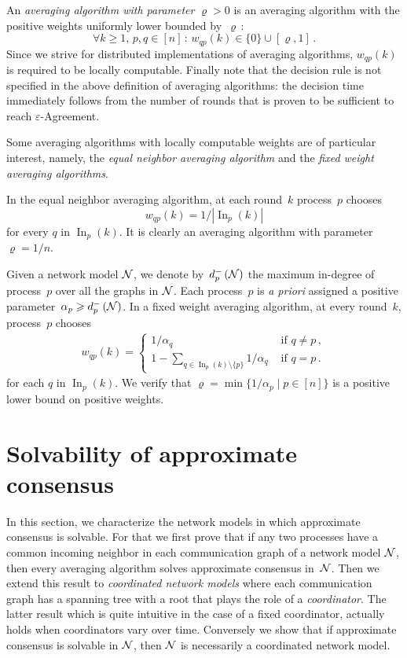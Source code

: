 \documentclass[a4paper]{article}
\theoremstyle{newthm}
\renewcommand{\ge}{\geqslant}
\renewcommand{\geq}{\geqslant}
\DeclareMathOperator\In{In}
\begin{document}
An {\em averaging algorithm with parameter} $\varrho >0$ is an averaging algorithm with
	the positive weights uniformly lower bounded by~$\varrho\,$: 
	$$ \forall k\ge 1,\, p,q \in [n] \,:\, w_{qp}(k) \in \{0\}\cup[ \varrho , 1] \,.$$
Since we strive for distributed implementations of averaging
     algorithms, $w_{qp}(k)$ is required to be locally computable.
Finally note that the decision rule is not specified in the above definition of averaging algorithms:
	the decision time immediately follows from the number of rounds that is proven 
	to be sufficient to reach $\varepsilon$-Agreement.


Some averaging algorithms with locally computable weights are of particular interest, namely,
	the {\em equal neighbor averaging algorithm\/} and the {\em fixed weight averaging algorithms}.
      
In the equal neighbor averaging algorithm, at each round~$k$ process~$p$ chooses 
	\begin{equation}\label{eq:EN}
	w_{qp}(k) = 1/|\In_p(k)|
	\end{equation}
	for every $q$ in $\In_p(k)$.
It is clearly an averaging algorithm  with parameter $\varrho = 1/n$.

Given a network model ${\cal N}$, we denote by~$d_p^-\left ({\cal N} \right )$ the  maximum
	in-degree of process~$p$ over all the graphs in ${\cal N}$.
Each process~$p$ is  {\em a priori\/} assigned a positive parameter~$\alpha_p \geq d^-_p\left ({\cal N} \right )$.
In a  fixed weight averaging algorithm, at  every round~$k$, 
	process~$p$ chooses  
\begin{align}
w_{qp}(k) =  \begin{cases}
            1/\alpha_q & \text{ if } q \neq p\,,\\
            1 - \sum_{q\in \In_p(k) \setminus \{p\}} 1/\alpha_q & \text{ if } q=p\,.
            \end{cases}
\end{align}
	for each $q$ in $\In_p(k)$.
We verify that 
	$\varrho =  \min\{1/\alpha_p \mid p \in [n] \} $ is a positive lower bound on  positive weights.


\section{Solvability of approximate consensus}

In this section, we characterize the network models in which approximate consensus is 
	solvable.
For that we first prove that if any two processes have a common incoming neighbor 
	in each communication graph of a network model ${\cal N}$, then every averaging algorithm 
	solves approximate consensus in~${\cal N}$.
Then we extend this result to {\em coordinated network models} where each communication graph has a
	spanning tree with a root that plays the role of a {\em coordinator}. 
The latter result which is quite intuitive in the case of a fixed coordinator, actually holds when
	coordinators vary over time.
Conversely we show that  if approximate consensus is solvable in  ${\cal N}$,
	then ${\cal N}$ is necessarily a coordinated network  model.
	
\end{document}
